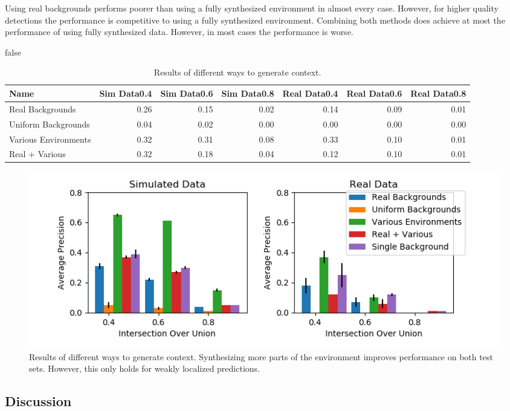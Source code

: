 Using real backgrounds performs poorer than using a fully synthesized environment in almost every case. However, for higher quality detections the performance is competitive to using a fully synthesized environment. Combining both methods does achieve at most the performance of using fully synthesized data. However, in most cases the performance is worse.   

\if false
\begin{table}[htbp]
	\caption{Results of different ways to generate context.}
	\begin{tabular}{lrrrrrr}
		\hline
		Name &  Sim Data0.4 &  Sim Data0.6 &  Sim Data0.8 &  Real Data0.4 &  Real Data0.6 &  Real Data0.8 \\
		\hline
		Real Backgrounds &         0.26 &         0.15 &         0.02 &          0.14 &          0.09 &          0.01 \\
		Uniform Backgrounds &         0.04 &         0.02 &         0.00 &          0.00 &          0.00 &          0.00 \\
		Various Environments &         0.32 &         0.31 &         0.08 &          0.33 &          0.10 &          0.01 \\
		Real + Various &         0.32 &         0.18 &         0.04 &          0.12 &          0.10 &          0.01 \\
		\hline
	\end{tabular}
	\label{tab:context}
\end{table}
\fi
\begin{figure}[htbp]
	\includegraphics[width=\textwidth]{fig/context_bar}
	\caption{Results of different ways to generate context. Synthesizing more parts of the environment improves performance on both test sets. However, this only holds for weakly localized predictions.}
	\label{fig:context}
\end{figure}

\subsection{Discussion}

